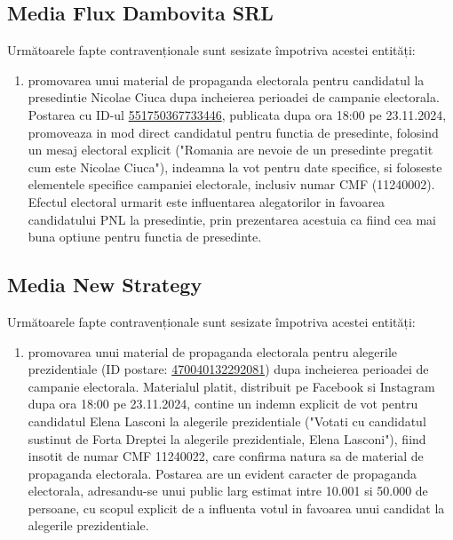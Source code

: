 \documentclass[a4paper,12pt]{article}
\begin{document}
\vspace{0.5cm}

\subsection{Media Flux Dambovita SRL}
Următoarele fapte contravenționale sunt sesizate împotriva acestei entități:

\begin{enumerate}[leftmargin=*, label=\arabic*.)]
    \item promovarea unui material de propaganda electorala pentru candidatul la presedintie Nicolae Ciuca dupa incheierea perioadei de campanie electorala. Postarea cu ID-ul \href{https://www.facebook.com/ads/library/?id=551750367733446}{551750367733446}, publicata dupa ora 18:00 pe 23.11.2024, promoveaza in mod direct candidatul pentru functia de presedinte, folosind un mesaj electoral explicit ("Romania are nevoie de un presedinte pregatit cum este Nicolae Ciuca"), indeamna la vot pentru date specifice, si foloseste elementele specifice campaniei electorale, inclusiv numar CMF (11240002). Efectul electoral urmarit este influentarea alegatorilor in favoarea candidatului PNL la presedintie, prin prezentarea acestuia ca fiind cea mai buna optiune pentru functia de presedinte.
\end{enumerate}

\vspace{0.5cm}

\subsection{Media New Strategy}
Următoarele fapte contravenționale sunt sesizate împotriva acestei entități:

\begin{enumerate}[leftmargin=*, label=\arabic*.)]
    \item promovarea unui material de propaganda electorala pentru alegerile prezidentiale (ID postare: \href{https://www.facebook.com/ads/library/?id=470040132292081}{470040132292081}) dupa incheierea perioadei de campanie electorala. Materialul platit, distribuit pe Facebook si Instagram dupa ora 18:00 pe 23.11.2024, contine un indemn explicit de vot pentru candidatul Elena Lasconi la alegerile prezidentiale ("Votati cu candidatul sustinut de Forta Dreptei la alegerile prezidentiale, Elena Lasconi"), fiind insotit de numar CMF 11240022, care confirma natura sa de material de propaganda electorala. Postarea are un evident caracter de propaganda electorala, adresandu-se unui public larg estimat intre 10.001 si 50.000 de persoane, cu scopul explicit de a influenta votul in favoarea unui candidat la alegerile prezidentiale.
\end{enumerate}
\end{document}
